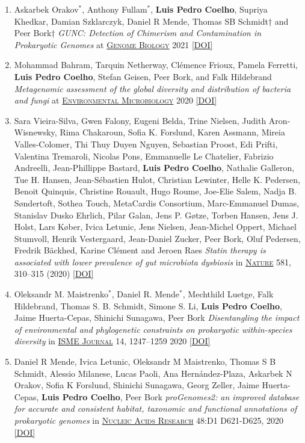 \documentclass{article}
\newcommand\showdoi[1]{%
    \href{http://dx.doi.org/#1}{[DOI]}%
}
\newcommand\pubname[1]{\textsc{\uline{#1}}}
\newcommand\costar{${}^{*}$}
\begin{document}
\begin{enumerate}[resume]
\item Askarbek Orakov\costar, Anthony Fullam\costar, \textbf{Luis Pedro
Coelho}, Supriya Khedkar, Damian Szklarczyk, Daniel R Mende, Thomas SB Schmidt†
and Peer Bork† \emph{GUNC: Detection of Chimerism and Contamination in
Prokaryotic Genomes} at \pubname{Genome Biology} 2021
\showdoi{10.1186/s13059-021-02393-0}

\item Mohammad Bahram, Tarquin Netherway, Clémence Frioux, Pamela Ferretti,
\textbf{Luis Pedro Coelho}, Stefan Geisen, Peer Bork, and Falk Hildebrand
\emph{Metagenomic assessment of the global diversity and distribution of
bacteria and fungi} at \pubname{Environmental Microbiology} 2020
\showdoi{10.1111/1462-2920.15314}

\item Sara Vieira-Silva, Gwen Falony, Eugeni Belda, Trine Nielsen, Judith
Aron-Wisnewsky, Rima Chakaroun, Sofia K. Forslund, Karen Assmann, Mireia
Valles-Colomer, Thi Thuy Duyen Nguyen, Sebastian Proost, Edi Prifti, Valentina
Tremaroli, Nicolas Pons, Emmanuelle Le Chatelier, Fabrizio Andreelli,
Jean-Phillippe Bastard, \textbf{Luis Pedro Coelho}, Nathalie Galleron, Tue H.
Hansen, Jean-Sébastien Hulot, Christian Lewinter, Helle K. Pedersen, Benoit
Quinquis, Christine Rouault, Hugo Roume, Joe-Elie Salem, Nadja B. Søndertoft,
Sothea Touch, MetaCardis Consortium, Marc-Emmanuel Dumas, Stanislav Dusko
Ehrlich, Pilar Galan, Jens P. Gøtze, Torben Hansen, Jens J. Holst, Lars Køber,
Ivica Letunic, Jens Nielsen, Jean-Michel Oppert, Michael Stumvoll, Henrik
Vestergaard, Jean-Daniel Zucker, Peer Bork, Oluf Pedersen, Fredrik Bäckhed,
Karine Clément and Jeroen Raes \emph{Statin therapy is associated with lower
prevalence of gut microbiota dysbiosis} in \pubname{Nature} 581, 310–315 (2020)
\showdoi{10.1038/s41586-020-2269-x}

\item Oleksandr M. Maistrenko\costar,  Daniel R. Mende\costar,  Mechthild
Luetge, Falk Hildebrand,  Thomas S. B. Schmidt,  Simone S. Li, \textbf{Luis
Pedro Coelho},  Jaime Huerta-Cepas,  Shinichi Sunagawa,  Peer Bork
\emph{Disentangling the impact of environmental and phylogenetic constraints on
prokaryotic within-species diversity} in \pubname{ISME Journal} 14, 1247–1259
2020 \showdoi{10.1038/s41396-020-0600-z}

\item Daniel R Mende, Ivica Letunic, Oleksandr M Maistrenko, Thomas S B Schmidt,
Alessio Milanese, Lucas Paoli, Ana Hernández-Plaza, Askarbek N Orakov, Sofia K
Forslund, Shinichi Sunagawa, Georg Zeller, Jaime Huerta-Cepas, \textbf{Luis
Pedro Coelho}, Peer Bork \emph{proGenomes2: an improved database for accurate
and consistent habitat, taxonomic and functional annotations of prokaryotic
genomes} in \pubname{Nucleic Acids Research} 48:D1 D621-D625, 2020
\showdoi{10.1093/nar/gkz1002}


\end{enumerate}
\end{document}
